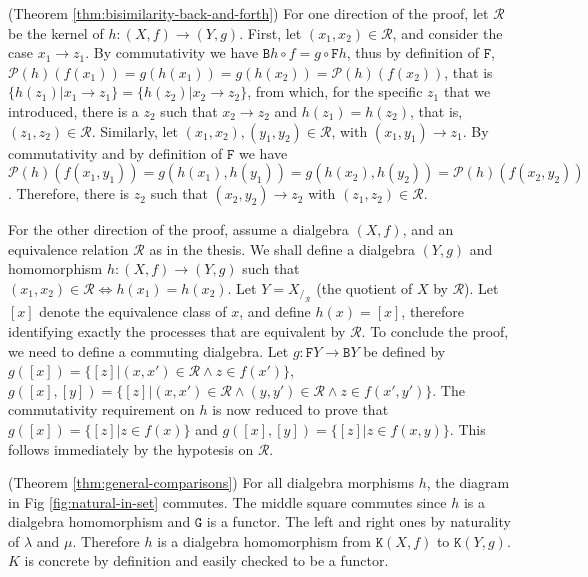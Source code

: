 \documentclass[orivec]{llncs}
\newcommand{\mF}[1]{\mathtt{#1}}
\newcommand{\F}{\mF{F}}
\newcommand{\G}{\mF{G}}
\newcommand{\B}{\mF{B}}
\newcommand{\K}{\mF{K}}
\newcommand{\utr}{\to}
\newcommand{\Pow}{\mathcal{P}}
\newcommand{\R}{\mathcal{R}}
\newcommand{\proend}{\medskip}
\renewenvironment{proof}{\begin{pro}}{\proend\end{pro}}
\begin{document}
\begin{proof}(Theorem \ref{thm:bisimilarity-back-and-forth})
 For one direction of the proof, let $\R$ be the kernel of $h : (X,f) \to (Y,g)$. First, let $(x_1,x_2) \in \R$, and consider the case $x_1 \utr z_1$. By commutativity we have $\B h \circ f = g \circ \F h$, thus by definition of $\F$, $\Pow(h)(f(x_1)) = g(h(x_1)) = g(h(x_2)) = \Pow(h)(f(x_2))$, that is $\{ h(z_1) | x_1 \utr z_1 \} = \{ h(z_2) | x_2 \utr z_2 \}$, from which, for the specific $z_1$ that we introduced, there is a $z_2$ such that $x_2 \utr z_2$ and $h(z_1) = h(z_2)$, that is, $(z_1,z_2) \in \R$. Similarly, let $(x_1,x_2),(y_1,y_2) \in \R$, with $(x_1,y_1) \utr z_1$. By commutativity and by definition of $\F$ we have $\Pow(h)(f(x_1,y_1)) = g(h(x_1),h(y_1)) = g(h(x_2),h(y_2)) = \Pow(h)(f(x_2,y_2))$. Therefore, there is $z_2$ such that $(x_2,y_2) \utr z_2$ with $(z_1,z_2) \in \R$.
 
 For the other direction of the proof, assume a dialgebra $(X,f)$, and an equivalence relation $\R$ as in the thesis. We shall define a dialgebra $(Y,g)$ and homomorphism $h : (X,f) \to (Y,g)$ such that $(x_1,x_2) \in \R \iff h(x_1) = h(x_2)$. Let $Y = X _{/_\R}$ (the quotient of $X$ by $\R$). Let $[x]$ denote the equivalence class of $x$, and define $h(x) = [x]$, therefore identifying exactly the processes that are equivalent by $\R$. To conclude the proof, we need to define a commuting dialgebra. Let $g : \F Y \to \B Y$ be defined by $g([x]) = \{ [z] | (x,x') \in \R \land z \in f(x') \}$, $g([x],[y]) = \{ [z] | (x,x') \in \R \land (y,y')\in \R \land z \in f(x',y')\}$. The commutativity requirement on $h$ is now reduced to prove that $g([x]) = \{ [z] | z \in f(x)\}$ and $g([x],[y]) = \{ [z] | z \in f(x,y)\}$. This follows immediately by the hypotesis on $\R$.
\end{proof}

\begin{proof}(Theorem \ref{thm:general-comparisons})
	For all dialgebra morphisms $h$, the diagram in Fig \ref{fig:natural-in-set} commutes. The middle square commutes since $h$ is a dialgebra homomorphism and $\G$ is a functor. The left and right ones by naturality of $\lambda$ and $\mu$. Therefore $h$ is a dialgebra homomorphism from $\K(X,f)$ to $\K(Y,g)$. $K$ is concrete by definition and easily checked to be a functor.
\end{proof}
\end{document}
